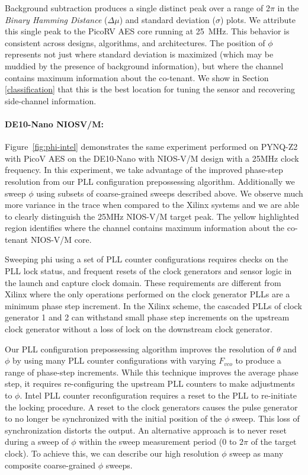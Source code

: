 Background subtraction produces a single distinct peak over a range of 2$\pi$ in the \textit{Binary Hamming Distance} ($\Delta\mu$) and standard deviation ($\sigma$) plots.
We attribute this single peak to the PicoRV AES core running at 25~MHz.
This behavior is consistent across designs, algorithms, and architectures.
The position of $\phi$ represents not just where standard deviation is maximized (which may be muddied by the presence of background information), but where the channel contains maximum information about the co-tenant.
We show in Section \ref{classification} that this is  the best location for tuning the sensor and recovering side-channel information. 

\paragraph{DE10-Nano NIOSV/M: }
Figure~\ref{fig:phi-intel} demonstrates the same experiment performed on PYNQ-Z2 with PicoV AES on the DE10-Nano with NIOS-V/M design with a 25MHz clock frequency. In this experiment, we take advantage of the improved phase-step resolution from our PLL configuration prepossessing algorithm. Additionally we sweep $\phi$ using subsets of coarse-grained sweeps described above. We observe much more variance in the trace when compared to the Xilinx systems and we are able to clearly distinguish the 25MHz NIOS-V/M target peak. The yellow highlighted region identifies where the channel contains maximum information about the co-tenant NIOS-V/M core.

Sweeping phi using a set of PLL counter configurations requires checks on the PLL lock status, and frequent resets of the clock generators and sensor logic in the launch and capture clock domain. These requirements are different from Xilinx where the only operations performed on the clock generator PLLs are a minimum phase step increment. In the Xilinx scheme, the cascaded PLLs of clock generator 1 and 2 can withstand small phase step increments on the upstream clock generator without a loss of lock on the downstream clock generator. 

Our PLL configuration prepossessing algorithm improves the resolution of $\theta$ and $\phi$ by using many PLL counter configurations with varying $F_{vco}$ to produce a range of phase-step increments. While this technique improves the average phase step, it requires re-configuring the upstream PLL counters to make adjustments to $\phi$. Intel PLL counter reconfiguration requires a reset to the PLL to re-initiate the locking procedure. A reset to the clock generators causes the pulse generator to no longer be synchronized with the initial position of the $\phi$ sweep. This loss of synchronization distorts the output. An alternative approach is to never reset during a sweep of $\phi$ within the sweep measurement period (0 to $2\pi$ of the target clock). To achieve this, we can describe our high resolution $\phi$ sweep as many composite coarse-grained $\phi$ sweeps. 

